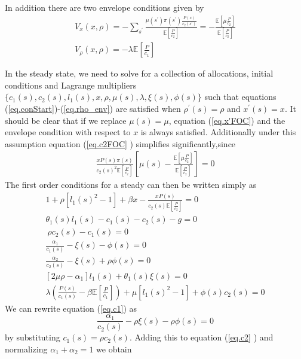 \documentclass[thmsb,11pt]{article}
\begin{document}
In addition there are two envelope conditions given by
\begin{align}
V_x(x,\rho) = -\sum_{s^{\prime }}\frac{\mu(s^{\prime })\pi(s^{\prime
})\frac{P(s)}{c_2(s^{\prime })}}{\mathbb{E}[\frac{P}{c_2}]} = -\frac{\mathbb{E}%
[\mu\frac{P}{c_2}]}{\mathbb{E}[\frac{P}{c_2}]} \\
V_{\rho}(x,\rho) = -\lambda\mathbb{E}[\frac{P}{c_1}]  \label{eq.rho_env}
\end{align}

In the steady state, we need to solve for a collection of allocations, initial conditions and Lagrange multipliers $%
\{c_1(s),c_2(s),l_1(s),x,\rho,\mu(s),\lambda,\xi(s),\phi(s)\}$ such that
equations (\ref{eq.conStart})-(\ref{eq.rho_env}) are satisfied when $%
\rho^{\prime }(s) = \rho$ and $x^{\prime }(s) = x$. It should be clear that if we replace $\mu(s) = \mu$, equation (\ref{eq.x'FOC})  and the envelope condition with respect to $x$ is
always satisfied. Additionally under this assumption equation (\ref{eq.c2FOC}%
) simplifies significantly,since
\begin{align*}
\frac{xP(s)\pi(s)}{c_2(s)^2\mathbb{E}[\frac{P}{c_2}]}\left[\mu(s)-\frac{\mathbb{E}%
[\mu\frac{P}{c_2}]}{\mathbb{E}[\frac{P}{c_2}]}\right] = 0
\end{align*}
The first order conditions for a
steady can then be written simply as
\begin{align}
1+\rho[l_1(s)^2-1]+\beta x-\frac{x P(s)}{ c_2(s)\mathbb{E}[\frac{P}{c_2}]} = 0
\label{eq.imp} \\
\theta_1(s) l_1(s) - c_1(s)-c_2(s)-g=0  \label{eq.res} \\
\ \rho c_2(s)-c_1(s) = 0  \label{eq.rhoFOC} \\
\frac{\alpha_1}{c_1(s)}-\xi(s)-\phi(s) = 0  \label{eq.c1} \\
\frac{\alpha_2}{c_2(s)}-\xi(s)+\rho\phi(s) = 0  \label{eq.c2} \\
[2\mu \rho-\alpha_1]l_1(s)+\theta_1(s)\xi(s) = 0  \label{eq.l1} \\
\lambda\left(\frac{P(s)}{c_1(s)}-\beta\mathbb{E}\left[\frac{P}{c_1}\right]\right)+\mu[%
l_1(s)^2-1]+\phi(s)c_2(s) = 0  \label{eq.R}
\end{align}
We can rewrite equation (\ref{eq.c1}) as
\begin{equation*}
\frac{\alpha_1}{c_2(s)} - \rho\xi(s) -\rho\phi(s) = 0
\end{equation*}%
by substituting $c_1(s) = \rho c_2(s)$. Adding this to equation (\ref{eq.c2}%
) and normalizing $\alpha_1+\alpha_2 = 1$ we obtain
\end{document}
